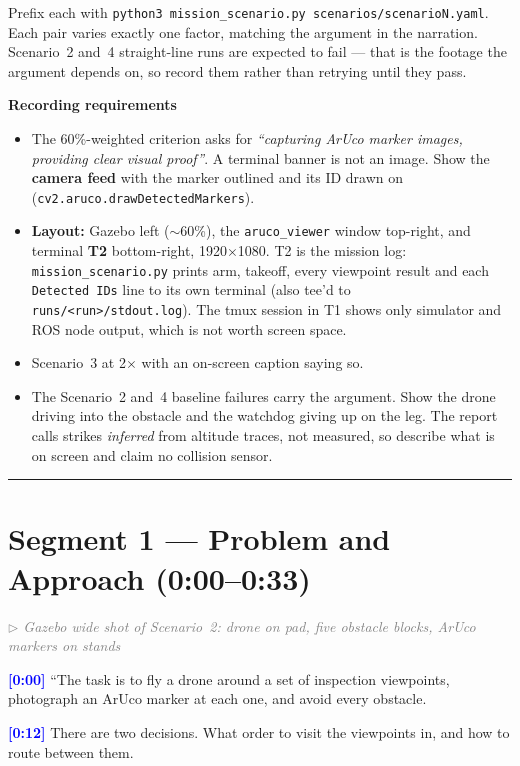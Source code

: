 \documentclass[11pt,a4paper]{article}
\newcommand{\timecode}[1]{\textbf{\textcolor{blue}{[#1]}}}
\newcommand{\cue}[1]{\textit{\textcolor{gray}{$\triangleright$ #1}}}
\begin{document}
\noindent Prefix each with \texttt{python3 mission\_scenario.py scenarios/scenarioN.yaml}.
Each pair varies exactly one factor, matching the argument in the narration.
Scenario~2 and~4 straight-line runs are expected to fail --- that is the footage
the argument depends on, so record them rather than retrying until they pass.

\medskip
\noindent\textbf{Recording requirements}
\begin{itemize}
  \item The 60\%-weighted criterion asks for \emph{``capturing ArUco marker images, providing clear visual proof''}. A terminal banner is not an image. Show the \textbf{camera feed} with the marker outlined and its ID drawn on (\texttt{cv2.aruco.drawDetectedMarkers}).
  \item \textbf{Layout:} Gazebo left ($\sim$60\%), the \texttt{aruco\_viewer} window top-right, and terminal \textbf{T2} bottom-right, 1920$\times$1080. T2 is the mission log: \texttt{mission\_scenario.py} prints arm, takeoff, every viewpoint result and each \texttt{Detected IDs} line to its own terminal (also tee'd to \texttt{runs/<run>/stdout.log}). The tmux session in T1 shows only simulator and ROS node output, which is not worth screen space.
  \item Scenario~3 at 2$\times$ with an on-screen caption saying so.
  \item The Scenario~2 and~4 baseline failures carry the argument. Show the drone driving into the obstacle and the watchdog giving up on the leg. The report calls strikes \emph{inferred} from altitude traces, not measured, so describe what is on screen and claim no collision sensor.
\end{itemize}

\bigskip\hrule\bigskip

\section*{Segment 1 --- Problem and Approach (0:00--0:33)}

\cue{Gazebo wide shot of Scenario~2: drone on pad, five obstacle blocks, ArUco markers on stands}

\timecode{0:00}
``The task is to fly a drone around a set of inspection viewpoints, photograph an ArUco marker at each one, and avoid every obstacle.

\timecode{0:12}
There are two decisions. What order to visit the viewpoints in, and how to route between them.
\end{document}
